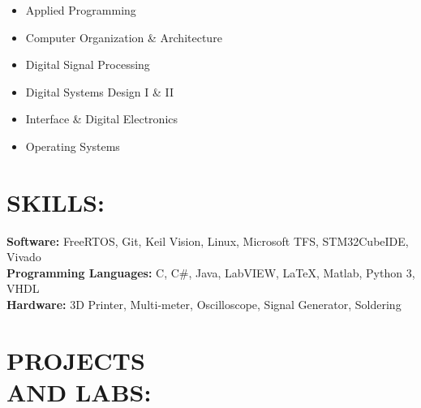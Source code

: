 \documentclass[line,margin]{res}
\begin{document}
\begin{resume}
		\begin{multicols}{2}
			\setlength\columnsep{1pt}
			\begin{itemize}
				\setlength{\itemindent}{-10pt}
				\item[] Applied Programming
				\item[] Computer Organization \& Architecture
				\item[] Digital Signal Processing
				\item[] \hspace{10pt} Digital Systems Design I \& II
				\item[] \hspace{10pt} Interface \& Digital Electronics
				\item[] \hspace{10pt} Operating Systems
			\end{itemize}
		\end{multicols}

	\section{SKILLS:}

		\textbf{Software:} FreeRTOS, Git, Keil \si{\micro}\hspace{-.5pt}Vision, Linux, Microsoft TFS, STM32CubeIDE, Vivado\\
		\textbf{Programming Languages:} C, C\#, Java, LabVIEW, \LaTeX, Matlab, Python 3, VHDL \\
		\textbf{Hardware:} 3D Printer, Multi-meter, Oscilloscope, Signal Generator, Soldering

	\section{PROJECTS \\AND LABS:}



\end{resume}
\end{document}
